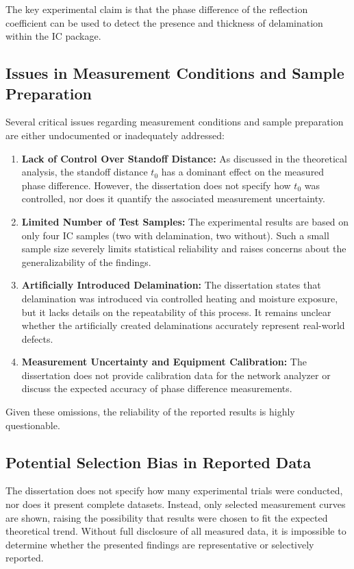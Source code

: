 \documentclass[10pt,twocolumn]{article}
\begin{document}
The key experimental claim is that the phase difference of the reflection coefficient can be used to detect the presence and thickness of delamination within the IC package.

\subsection{Issues in Measurement Conditions and Sample Preparation}

Several critical issues regarding measurement conditions and sample preparation are either undocumented or inadequately addressed:

\begin{enumerate}
    \item \textbf{Lack of Control Over Standoff Distance:} As discussed in the theoretical analysis, the standoff distance \( t_0 \) has a dominant effect on the measured phase difference. However, the dissertation does not specify how \( t_0 \) was controlled, nor does it quantify the associated measurement uncertainty.
    \item \textbf{Limited Number of Test Samples:} The experimental results are based on only four IC samples (two with delamination, two without). Such a small sample size severely limits statistical reliability and raises concerns about the generalizability of the findings.
    \item \textbf{Artificially Introduced Delamination:} The dissertation states that delamination was introduced via controlled heating and moisture exposure, but it lacks details on the repeatability of this process. It remains unclear whether the artificially created delaminations accurately represent real-world defects.
    \item \textbf{Measurement Uncertainty and Equipment Calibration:} The dissertation does not provide calibration data for the network analyzer or discuss the expected accuracy of phase difference measurements.
\end{enumerate}

Given these omissions, the reliability of the reported results is highly questionable.

\subsection{Potential Selection Bias in Reported Data}

The dissertation does not specify how many experimental trials were conducted, nor does it present complete datasets. Instead, only selected measurement curves are shown, raising the possibility that results were chosen to fit the expected theoretical trend. Without full disclosure of all measured data, it is impossible to determine whether the presented findings are representative or selectively reported.
\end{document}

